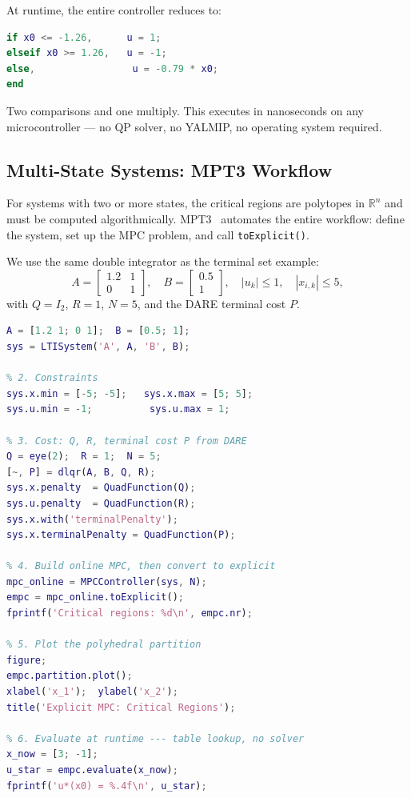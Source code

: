 At runtime, the entire controller reduces to:
\begin{lstlisting}[language=Matlab, numbers=none]
if x0 <= -1.26,      u = 1;
elseif x0 >= 1.26,   u = -1;
else,                 u = -0.79 * x0;
end
\end{lstlisting}
Two comparisons and one multiply. This executes in nanoseconds on any microcontroller --- no QP solver, no YALMIP, no operating system required.

\subsection{Multi-State Systems: MPT3 Workflow}

For systems with two or more states, the critical regions are polytopes in $\mathbb{R}^n$ and must be computed algorithmically. MPT3~\cite{Herceg2013} automates the entire workflow: define the system, set up the MPC problem, and call \texttt{toExplicit()}.

We use the same double integrator as the terminal set example:
\[
A = \begin{bmatrix} 1.2 & 1 \\ 0 & 1 \end{bmatrix}, \quad B = \begin{bmatrix} 0.5 \\ 1 \end{bmatrix}, \quad |u_k| \le 1, \quad |x_{i,k}| \le 5,
\]
with $Q = I_2$, $R = 1$, $N = 5$, and the DARE terminal cost $P$.

\begin{lstlisting}[language=Matlab, caption={Computing Explicit MPC via MPT3}]
% 1. System definition
A = [1.2 1; 0 1];  B = [0.5; 1];
sys = LTISystem('A', A, 'B', B);

% 2. Constraints
sys.x.min = [-5; -5];   sys.x.max = [5; 5];
sys.u.min = -1;          sys.u.max = 1;

% 3. Cost: Q, R, terminal cost P from DARE
Q = eye(2);  R = 1;  N = 5;
[~, P] = dlqr(A, B, Q, R);
sys.x.penalty  = QuadFunction(Q);
sys.u.penalty  = QuadFunction(R);
sys.x.with('terminalPenalty');
sys.x.terminalPenalty = QuadFunction(P);

% 4. Build online MPC, then convert to explicit
mpc_online = MPCController(sys, N);
empc = mpc_online.toExplicit();
fprintf('Critical regions: %d\n', empc.nr);

% 5. Plot the polyhedral partition
figure;
empc.partition.plot();
xlabel('x_1');  ylabel('x_2');
title('Explicit MPC: Critical Regions');

% 6. Evaluate at runtime --- table lookup, no solver
x_now = [3; -1];
u_star = empc.evaluate(x_now);
fprintf('u*(x0) = %.4f\n', u_star);
\end{lstlisting}

